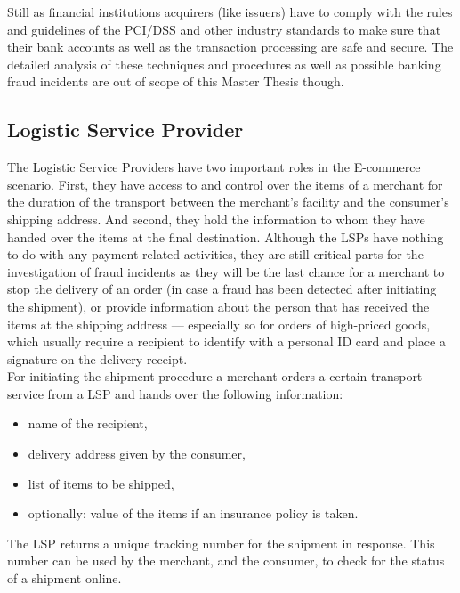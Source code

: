 Still as financial institutions acquirers (like issuers) have to comply with the rules and guidelines of the \gls{PCI/DSS} and other industry standards to make sure that their bank accounts as well as the transaction processing are safe and secure. The detailed analysis of these techniques and procedures as well as possible banking fraud incidents are out of scope of this Master Thesis though.


\subsection{Logistic Service Provider}
\label{subsec:stakeholder_lsp}

The Logistic Service Providers have two important roles in the \gls{E-commerce} scenario. First, they have access to and control over the items of a merchant for the duration of the transport between the merchant's facility and the consumer's shipping address. And second, they hold the information to whom they have handed over the items at the final destination. Although the \gls{LSP}s have nothing to do with any payment-related activities, they are still critical parts for the investigation of fraud incidents as they will be the last chance for a merchant to stop the delivery of an order (in case a fraud has been detected after initiating the shipment), or provide information about the person that has received the items at the shipping address --- especially so for orders of high-priced goods, which usually require a recipient to identify with a personal ID card and place a signature on the delivery receipt. \\

For initiating the shipment procedure a merchant orders a certain transport service from a \gls{LSP} and hands over the following information:\@

\begin{itemize}
	\item name of the recipient,
	\item delivery address given by the consumer,
	\item list of items to be shipped,
	\item optionally: value of the items if an insurance policy is taken.
\end{itemize}

The \gls{LSP} returns a unique tracking number for the shipment in response. This number can be used by the merchant, and the consumer, to check for the status of a shipment online. \\

